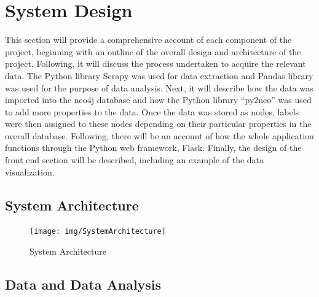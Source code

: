 \chapter{System Design}
This section will provide a comprehensive account of each component of the project, beginning with an outline of the overall design and architecture of the project. Following, it will discuss the process undertaken to acquire the relevant data. The Python library Scrapy was used for data extraction and Pandas library was used for the purpose of data analysis. Next, it will describe how the data was imported into the neo4j database and how the Python library “py2neo” was used to add more properties to the data. Once the data was stored as nodes, labels were then assigned to these nodes depending on their particular properties in the overall database. Following, there will be an account of how the whole application functions through the Python web framework, Flask. Finally, the design of the front end section will be described, including an example of the data visualization.
\section{System Architecture}
	\begin{figure}[h]
		\caption{System Architecture}
		\centering
		\texttt{[image: img/SystemArchitecture]}
	\end{figure}
\pagebreak
\section{Data and Data Analysis}
